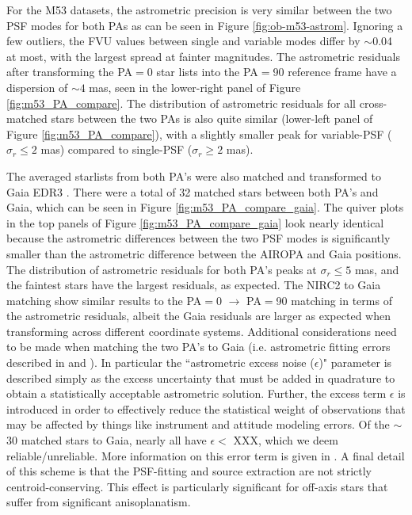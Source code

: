 \documentclass[]{spie}  %
\begin{document}
For the M53 datasets, the astrometric precision is very similar between the two PSF modes for both PAs as can be seen in Figure \ref{fig:ob-m53-astrom}. Ignoring a few outliers, the FVU values between single and variable modes differ by ${\sim}$0.04 at most, with the largest spread at fainter magnitudes. The astrometric residuals after transforming the PA$=$0 star lists into the PA$=$90 reference frame have a dispersion of ${\sim}4$ mas, seen in the lower-right panel of Figure \ref{fig:m53_PA_compare}. The distribution of astrometric residuals for all cross-matched stars between the two PAs is also quite similar (lower-left panel of Figure \ref{fig:m53_PA_compare}), with a slightly smaller peak for variable-PSF ($\sigma_{r}\leq2$ mas) compared to single-PSF ($\sigma_{r}\geq2$ mas). 

The averaged starlists from both PA's were also matched and transformed to Gaia EDR3 \citep{brown:2021a}. There were a total of 32 matched stars between both PA's and Gaia, which can be seen in Figure \ref{fig:m53_PA_compare_gaia}. The quiver plots in the top panels of Figure \ref{fig:m53_PA_compare_gaia} look nearly identical because the astrometric differences between the two PSF modes is significantly smaller than the astrometric difference between the AIROPA and Gaia positions. The distribution of astrometric residuals for both PA's peaks at $\sigma_{r}\leq5$ mas, and the faintest stars have the largest residuals, as expected. The NIRC2 to Gaia matching show similar results to the PA$=$0 $\rightarrow$ PA$=$90 matching in terms of the astrometric residuals, albeit the Gaia residuals are larger as expected when transforming across different coordinate systems. Additional considerations need to be made when matching the two PA's to Gaia (i.e. astrometric fitting errors described in \cite{brown:2018a} and \cite{brown:2021a}). In particular the ``astrometric excess noise ($\epsilon$)" parameter is described simply as the excess uncertainty that must be added in quadrature to obtain a statistically acceptable astrometric solution. Further, the excess term $\epsilon$ is introduced in order to effectively reduce the statistical weight of observations that may be affected by things like instrument and attitude modeling errors. Of the ${\sim}$30 matched stars to Gaia, nearly all have $\epsilon < $ XXX, which we deem reliable/unreliable. More information on this error term is given in \cite{lindegren:2012a}. A final detail of this scheme is that the PSF-fitting and source extraction are not strictly centroid-conserving. This effect is particularly significant for off-axis stars that suffer from significant anisoplanatism.
\end{document}
